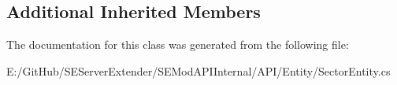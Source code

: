 \subsection*{Additional Inherited Members}


The documentation for this class was generated from the following file\+:\begin{DoxyCompactItemize}
\item 
E\+:/\+Git\+Hub/\+S\+E\+Server\+Extender/\+S\+E\+Mod\+A\+P\+I\+Internal/\+A\+P\+I/\+Entity/Sector\+Entity.\+cs\end{DoxyCompactItemize}
